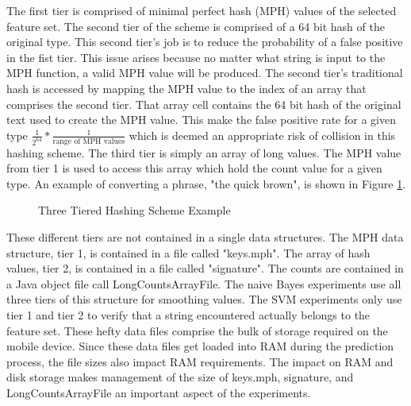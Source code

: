 		The first tier is comprised of minimal perfect hash (MPH) values of the selected feature set.  The second tier of the scheme is comprised of a 64 bit hash of the original type.  This second tier's job is to reduce the probability of a false positive in the fist tier.  This issue arises because no matter what string is input to the MPH function, a valid MPH value will be produced.  The second tier's traditional hash is accessed by mapping the MPH value to the index of an array that comprises the second tier.  That array cell contains the 64 bit hash of the original text used to create the MPH value.  This make the false positive rate for a given type $\frac{1}{2^{64}} * \frac{1}{\text{range of MPH values}}$ which is deemed an appropriate risk of collision in this hashing scheme.  The third tier is simply an array of long values.  The MPH value from tier 1 is used to access this array which hold the count value for a given type.  An example of converting a phrase, "the quick brown", is shown in Figure \ref{fig:3tierHashExample}. 
		
		\begin{figure}[ht!]
			\begin{center}
				\caption{Three Tiered Hashing Scheme Example}
				\label{fig:3tierHashExample}
			\end{center}
		\end{figure}
		
		These different tiers are not contained in a single data structures.  The MPH data structure, tier 1, is contained in a file called "keys.mph".  The array of hash values, tier 2, is contained in a file called "signature".  The counts are contained in a Java object file call LongCountsArrayFile.  The naive Bayes experiments use all three tiers of this structure for smoothing values.  The SVM experiments only use tier 1 and tier 2 to verify that a string encountered actually belongs to the feature set.  These hefty data files comprise the bulk of storage required on the mobile device.  Since these data files get loaded into RAM during the prediction process, the file sizes also impact RAM requirements. The impact on RAM and disk storage makes management of the size of keys.mph, signature, and LongCountsArrayFile an important aspect of the experiments.

